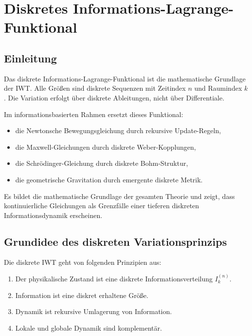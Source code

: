 
\chapter{Diskretes Informations-Lagrange-Funktional}
\label{ch:lagrange_funktional}

\section{Einleitung}
\label{sec:lagrange_einleitung}

Das diskrete Informations-Lagrange-Funktional ist die mathematische Grundlage der IWT. Alle Größen sind diskrete Sequenzen mit Zeitindex \( n \) und Raumindex \( k \). Die Variation erfolgt über diskrete Ableitungen, nicht über Differentiale.

Im informationsbasierten Rahmen ersetzt dieses Funktional:

\begin{itemize}
    \item die Newtonsche Bewegungsgleichung durch rekursive Update-Regeln,
    \item die Maxwell-Gleichungen durch diskrete Weber-Kopplungen,
    \item die Schrödinger-Gleichung durch diskrete Bohm-Struktur,
    \item die geometrische Gravitation durch emergente diskrete Metrik.
\end{itemize}

Es bildet die mathematische Grundlage der gesamten Theorie und zeigt, dass kontinuierliche Gleichungen als Grenzfälle einer tieferen diskreten Informationsdynamik erscheinen.

\section{Grundidee des diskreten Variationsprinzips}
\label{sec:varia_prinzip}

Die diskrete IWT geht von folgenden Prinzipien aus:

\begin{enumerate}
    \item Der physikalische Zustand ist eine diskrete Informationsverteilung \( I_k^{(n)} \).
    \item Information ist eine diskret erhaltene Größe.
    \item Dynamik ist rekursive Umlagerung von Information.
    \item Lokale und globale Dynamik sind komplementär.
\end{enumerate}

